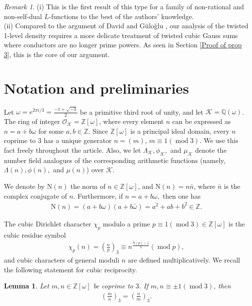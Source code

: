 \documentclass[11pt]{amsart}
\newcommand{\norm}{\mathrm{N}}
\newtheorem{lemma}[prop]{Lemma}
\numberwithin{equation}{section}
\newcommand{\mymod}[1]{(\operatorname{mod} #1)}
\theoremstyle{remark}
\newtheorem*{remark}{Remark}
\begin{document}
\begin{remark}
(i) This is the first result of this type for a family of non-rational and non-self-dual $L$-functions to the best of the authors' knowledge.\\
(ii) Compared to the argument of David and G\"{u}lo\u{g}lu \cite{DG}, our analysis of the twisted 1-level density requires a more delicate treatment of twisted cubic Gauss sums where conductors are no longer prime powers. As seen in Section \ref{Proof of prop 3}, this is the core of our argument.
\end{remark}


\section{Notation and preliminaries}\label{background}

Let $\omega=e^{2\pi i/3}=\frac{-1+\sqrt{-3}}{2}$ be a primitive third root of unity, and let $\mathcal{K}=\mathbb{Q}(\omega)$. The ring of integer $\mathcal{O}_\mathcal{K}=\mathbb{Z}[\omega]$, where
every element $n$ can be expressed as $n=a+b\omega$ for some $a, b \in \mathbb{Z}.$
Since $\mathbb{Z}[\omega]$ is a principal ideal domain, every $n$ coprime to 3 has a unique generator $n=(m)$, $m\equiv1\mymod{3}.$ We use this fact freely throughout the article. Also, we let $\Lambda_\mathcal{K}, \phi_\mathcal{K},$ and $\mu_\mathcal{K}$ denote the number field analogues of the corresponding arithmetic functions (namely, $\Lambda(n), \phi(n),$ and $\mu(n)$) over $\mathcal{K}.$ 

We denote by $\norm(n)$ the norm of $n\in \mathbb{Z}[\omega]$, and $\norm(n)=n\bar{n}$, where $\bar{n}$ is the complex conjugate of $n.$ Furthermore, if $n=a+b\omega,$ then one has
\begin{align*}
    \norm(n)=(a+b\omega)(a+b\bar{\omega})=a^2+ab+b^2\in \mathbb{Z}.
\end{align*}

The cubic Dirichlet character $\chi_p$ modulo a prime $p\equiv 1\mymod{3}\in \mathbb{Z}[\omega]$ is the cubic residue symbol
\begin{align*}
    \chi_p(n)=\left(\frac{n}{p}\right)_3\equiv n^{\frac{\norm(p)-1}{3}}\mymod{p},
\end{align*}
and cubic characters of general moduli $n$ are defined multiplicatively. We recall the following statement for cubic reciprocity.
\begin{lemma}
    Let $m, n\in \mathbb{Z}[\omega]$ be coprime to $3$. If $m,n\equiv \pm 1\mymod{3}$, then
    \begin{align*}
        \left(\frac{m}{n}\right)_3=\left(\frac{n}{m}\right)_3.
    \end{align*}
\end{lemma} 
\end{document}
